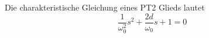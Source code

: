 Die charakteristische Gleichung eines PT2 Glieds lautet
$$\frac{1}{\omega_0^2} s^2 + \frac{2 d}{\omega_0}s + 1 = 0$$
